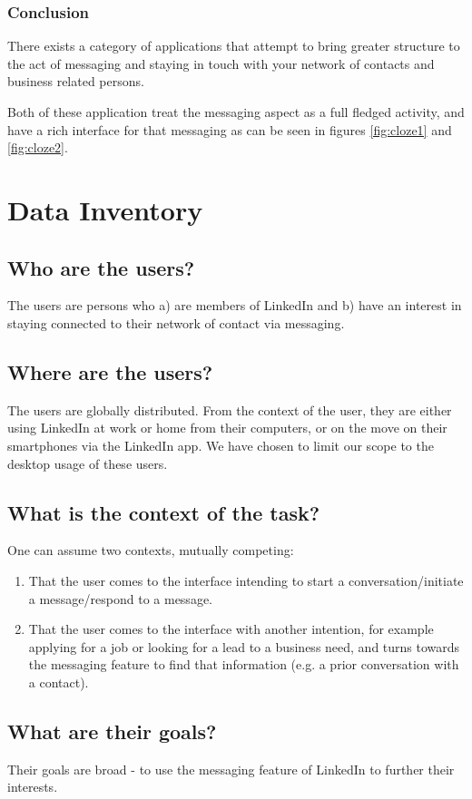 \documentclass[
	letterpaper, %
]{jdf}
\begin{document}
\subsubsection{Conclusion}
There exists a category of applications that attempt to bring greater structure to the act of messaging and staying in touch with your network of contacts and business related persons.

Both of these application treat the messaging aspect as a full fledged activity, and have a rich interface for that messaging as can be seen in figures \ref{fig:cloze1} and \ref{fig:cloze2}.

\section{Data Inventory}
\subsection{Who are the users?}
The users are persons who a) are members of LinkedIn and b) have an interest in staying connected to their network of contact via messaging.
\subsection{Where are the users?}
The users are globally distributed. From the context of the user, they are either using LinkedIn at work or home from their computers, or on the move on their smartphones via the LinkedIn app. We have chosen to limit our scope to the desktop usage of these users.
\subsection{What is the context of the task?}
One can assume two contexts, mutually competing:
\begin{enumerate}
    \item That the user comes to the interface intending to start a conversation/initiate a message/respond to a message.
    \item That the user comes to the interface with another intention, for example applying for a job or looking for a lead to a business need, and turns towards the messaging feature to find that information (e.g. a prior conversation with a contact).
\end{enumerate}

\subsection{What are their goals?}
Their goals are broad - to use the messaging feature of LinkedIn to further their interests.
\end{document}
